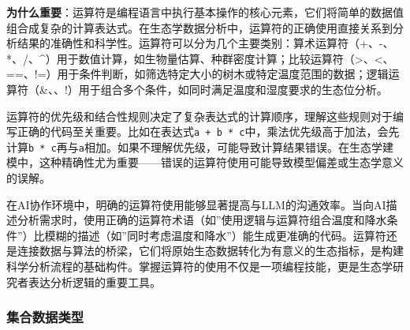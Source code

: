 \documentclass[
]{book}
\begin{document}
\textbf{为什么重要}：运算符是编程语言中执行基本操作的核心元素，它们将简单的数据值组合成复杂的计算表达式。在生态学数据分析中，运算符的正确使用直接关系到分析结果的准确性和科学性。运算符可以分为几个主要类别：算术运算符（+、-、*、/、\^{}）用于数值计算，如生物量估算、种群密度计算；比较运算符（\textgreater、\textless、==、!=）用于条件判断，如筛选特定大小的树木或特定温度范围的数据；逻辑运算符（\&、\textbar、!）用于组合多个条件，如同时满足温度和湿度要求的生态位分析。

运算符的优先级和结合性规则决定了复杂表达式的计算顺序，理解这些规则对于编写正确的代码至关重要。比如在表达式\texttt{a\ +\ b\ *\ c}中，乘法优先级高于加法，会先计算\texttt{b\ *\ c}再与\texttt{a}相加。如果不理解优先级，可能导致计算结果错误。在生态学建模中，这种精确性尤为重要------错误的运算符使用可能导致模型偏差或生态学意义的误解。

在AI协作环境中，明确的运算符使用能够显著提高与LLM的沟通效率。当向AI描述分析需求时，使用正确的运算符术语（如''使用逻辑与运算符组合温度和降水条件''）比模糊的描述（如''同时考虑温度和降水''）能生成更准确的代码。运算符还是连接数据与算法的桥梁，它们将原始生态数据转化为有意义的生态指标，是构建科学分析流程的基础构件。掌握运算符的使用不仅是一项编程技能，更是生态学研究者表达分析逻辑的重要工具。

\hypertarget{ux96c6ux5408ux6570ux636eux7c7bux578b}{%
\subsubsection{集合数据类型}\label{ux96c6ux5408ux6570ux636eux7c7bux578b}}
\end{document}
